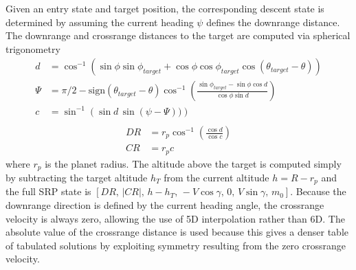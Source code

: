 \documentclass[letterpaper, preprint, paper,11pt]{AAS}
\begin{document}
Given an entry state and target position, the corresponding descent state is determined by assuming the current heading $\psi$ defines the downrange distance. The downrange and crossrange distances to the target are computed via spherical trigonometry
\begin{align}
d &= \cos^{-1}\left(\sin\phi\sin\phi_{target} +\cos\phi\cos\phi_{target}\cos(\theta_{target}-\theta)        \right) \\
\Psi &= \pi/2 - \mathrm{sign}(\theta_{target}-\theta) \cos^{-1}\left(\frac{\sin\phi_{target}-\sin\phi\cos d}{\cos\phi\sin d}  \right) \\
c &= \sin^{-1}\left(\sin d\,\sin(\psi-\Psi))\right) \\
\end{align}
\begin{align}
DR &= r_p\cos^{-1}\left(\frac{\cos d}{\cos c}\right)\\
CR &= r_pc
\end{align}
where $r_p$ is the planet radius. The altitude above the target is computed simply by subtracting the target altitude $h_T$ from the current altitude $h = R-r_p$ and the full SRP state is $[DR,\, |CR|,\, h-h_T,\, -V\cos\gamma,\, 0,\, V\sin\gamma,\, m_0]$. Because the downrange direction is defined by the current heading angle, the crossrange velocity is always zero, allowing the use of 5D interpolation rather than 6D. The absolute value of the crossrange distance is used because this gives a denser table of tabulated solutions by exploiting symmetry resulting from the zero crossrange velocity. 
\end{document}
